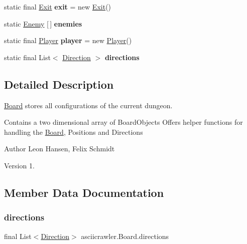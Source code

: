 \begin{DoxyCompactItemize}
static final \hyperlink{classasciicrawler_1_1Exit}{Exit} {\bfseries exit} = new \hyperlink{classasciicrawler_1_1Exit}{Exit}()
\item 
\mbox{\label{classasciicrawler_1_1Board_aa15d853590a296fa341b734b21e79b43}} 
static \hyperlink{classasciicrawler_1_1Enemy}{Enemy} \mbox{[}$\,$\mbox{]} {\bfseries enemies}
\item 
\mbox{\label{classasciicrawler_1_1Board_ab6a0f4e30f00268e4b33473efedb1c83}} 
static final \hyperlink{classasciicrawler_1_1Player}{Player} {\bfseries player} = new \hyperlink{classasciicrawler_1_1Player}{Player}()
\item 
static final List$<$ \hyperlink{enumasciicrawler_1_1Direction}{Direction} $>$ {\bfseries directions}
\end{DoxyCompactItemize}


\subsection{Detailed Description}
\hyperlink{classasciicrawler_1_1Board}{Board} stores all configurations of the current dungeon. 

Contains a two dimensional array of Board\+Objects Offers helper functions for handling the \hyperlink{classasciicrawler_1_1Board}{Board}, Positions and Directions

\begin{DoxyAuthor}{Author}
Leon Hansen, Felix Schmidt 
\end{DoxyAuthor}
\begin{DoxyVersion}{Version}
1. 
\end{DoxyVersion}


\subsection{Member Data Documentation}
\mbox{\label{classasciicrawler_1_1Board_a26b7ed317b5b9b2c8dd122a1cb369841}} 
\subsubsection{\texorpdfstring{directions}{directions}}
{\footnotesize\ttfamily final List$<$\hyperlink{enumasciicrawler_1_1Direction}{Direction}$>$ asciicrawler.\+Board.\+directions\hspace{0.3cm}{\ttfamily [static]}}

